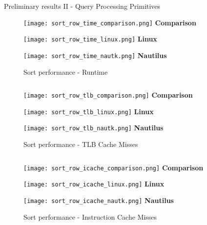 \begin{block}{Preliminary results II - Query Processing Primitives}
\begin{figure}
  \begin{minipage}{0.325\linewidth}
    \centering
  \texttt{[image: sort\_row\_time\_comparison.png]}
{\small \textbf{Comparison}}
\end{minipage}
\begin{minipage}{0.325\linewidth}
    \centering
  \texttt{[image: sort\_row\_time\_linux.png]}
 {\small\textbf{Linux}}
  \end{minipage}
  \begin{minipage}{0.325\linewidth}
    \centering
    \texttt{[image: sort\_row\_time\_nautk.png]}
{\small\textbf{Nautilus}}
  \end{minipage}
\caption{Sort performance - Runtime}
  \end{figure}$\,$\\[-25mm]
\begin{figure}
  \begin{minipage}{0.325\linewidth}
    \centering
  \texttt{[image: sort\_row\_tlb\_comparison.png]}
{\small \textbf{Comparison}}
\end{minipage}
\begin{minipage}{0.325\linewidth}
    \centering
  \texttt{[image: sort\_row\_tlb\_linux.png]}
 {\small\textbf{Linux}}
  \end{minipage}
  \begin{minipage}{0.325\linewidth}
    \centering
    \texttt{[image: sort\_row\_tlb\_nautk.png]}
{\small\textbf{Nautilus}}
  \end{minipage}
\caption{Sort performance - TLB Cache Misses}
  \end{figure}$\,$\\[-25mm]
\begin{figure}
  \begin{minipage}{0.325\linewidth}
    \centering
  \texttt{[image: sort\_row\_icache\_comparison.png]}
{\small \textbf{Comparison}}
\end{minipage}
\begin{minipage}{0.325\linewidth}
    \centering
  \texttt{[image: sort\_row\_icache\_linux.png]}
 {\small\textbf{Linux}}
  \end{minipage}
  \begin{minipage}{0.325\linewidth}
    \centering
    \texttt{[image: sort\_row\_icache\_nautk.png]}
{\small\textbf{Nautilus}}
  \end{minipage}
\caption{Sort performance - Instruction Cache Misses}
  \end{figure}




\end{block}
